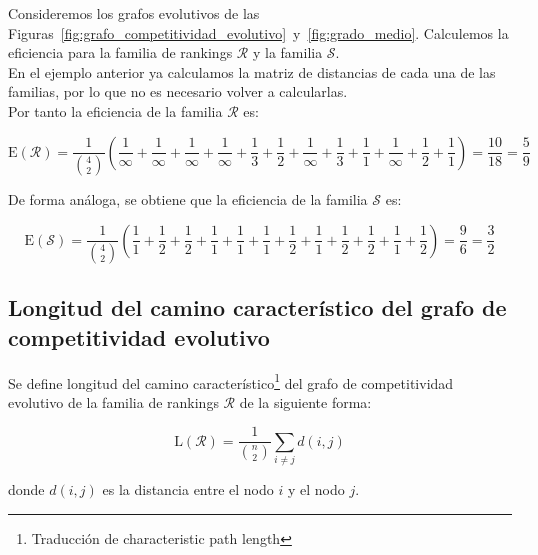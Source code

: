 \begin{ejemplo}
Consideremos los grafos evolutivos de las Figuras~\ref{fig:grafo_competitividad_evolutivo}~y~\ref{fig:grado_medio}. Calculemos la eficiencia para la familia de rankings $\mathcal{R}$ y la familia $\mathcal{S}$.\\

En el ejemplo anterior ya calculamos la matriz de distancias de cada una de las familias, por lo que no es necesario volver a calcularlas.\\

Por tanto la eficiencia de la familia $\mathcal{R}$ es:

\begin{equation*}
\mathrm{E}(\mathcal{R}) = \dfrac{1}{\binom{4}{2}} \left( \dfrac{1}{\infty} + \dfrac{1}{\infty} + \dfrac{1}{\infty} + \dfrac{1}{\infty} + \dfrac{1}{3} + \dfrac{1}{2} + \dfrac{1}{\infty} + \dfrac{1}{3} + \dfrac{1}{1} + \dfrac{1}{\infty} + \dfrac{1}{2} + \dfrac{1}{1}\right) = \dfrac{10}{18} = \dfrac{5}{9}  
\end{equation*}

De forma análoga, se obtiene que la eficiencia de la familia $\mathcal{S}$ es:

\begin{equation*}
\mathrm{E}(\mathcal{S}) = \dfrac{1}{\binom{4}{2}} \left( \dfrac{1}{1} + \dfrac{1}{2} + \dfrac{1}{2} + \dfrac{1}{1} + \dfrac{1}{1} + \dfrac{1}{1} + \dfrac{1}{2} + \dfrac{1}{1} + \dfrac{1}{2} + \dfrac{1}{2} + \dfrac{1}{1} + \dfrac{1}{2}\right) = \dfrac{9}{6} = \dfrac{3}{2} 
\end{equation*}

\subsection*{Longitud del camino característico del grafo de competitividad evolutivo}

\begin{defi}
Se define longitud del camino característico\footnote{Traducción de characteristic path length} del grafo de competitividad evolutivo de la familia de rankings $\mathcal{R}$ de la siguiente forma:

\begin{equation}
\mathrm{L}(\mathcal{R}) = \dfrac{1}{\binom{n}{2}} \sum_{i\neq j} d(i,j)
\end{equation}

donde $d(i,j)$ es la distancia entre el nodo $i$ y el nodo $j$.
\end{defi}


\end{ejemplo}
